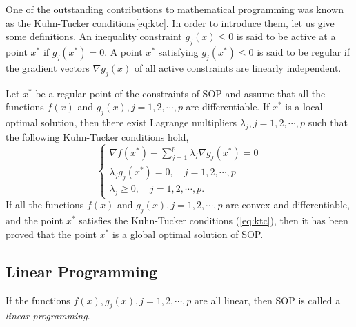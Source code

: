 One of the outstanding contributions to mathematical programming was known as
the Kuhn-Tucker conditions\ref{eq:ktc}. In order to introduce them, let us give
some definitions. An inequality constraint $g_j(x)\le 0$ is said to be active at
a point $x^*$ if $g_j(x^*)=0$. A point $x^*$ satisfying $g_j(x^*)\le 0$ is said
to be regular if the gradient vectors $\nabla g_j(x)$ of all active constraints
are linearly independent.

Let $x^*$ be a regular point of the constraints of SOP and assume that all the
functions $f(x)$ and $g_j(x),j=1,2,\cdots,p$ are differentiable. If $x^*$ is a
local optimal solution, then there exist Lagrange multipliers
$\lambda_j,j=1,2,\cdots,p$ such that the following Kuhn-Tucker conditions hold,
\begin{equation}
\label{eq:ktc}
\left\{\begin{array}{l}
    \nabla f(x^*)-\sum\limits_{j=1}^p\lambda_j\nabla g_j(x^*)=0\\[0.3cm]
    \lambda_jg_j(x^*)=0,\quad j=1,2,\cdots,p\\[0.2cm]
    \lambda_j\ge 0,\quad j=1,2,\cdots,p.
\end{array}\right.
\end{equation}
If all the functions $f(x)$ and $g_j(x),j=1,2,\cdots,p$ are convex and
differentiable, and the point $x^*$ satisfies the Kuhn-Tucker conditions
(\ref{eq:ktc}), then it has been proved that the point $x^*$ is a global optimal
solution of SOP.

\subsection{Linear Programming}
\label{sec:lp}

If the functions $f(x),g_j(x),j=1,2,\cdots,p$ are all linear, then SOP is called
a {\em linear programming}.


